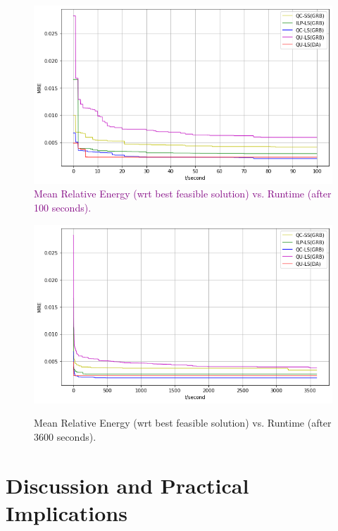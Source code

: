 \documentclass[preprint,12pt]{elsarticle}
\begin{document}
\begin{figure}[t]%
	
	\includegraphics[width=\textwidth]{Figures/MRE_100s_DA3_NEW.png}  
	\caption{\textcolor{purple}{Mean Relative Energy (wrt best feasible solution) vs. Runtime (after 100 seconds).}}%
	
	\label{fig:results1}%
\end{figure}

\begin{figure}[t]%
	
	\includegraphics[width=\textwidth]{Figures/MRE_3600s_DA3.png}   \\%
	\caption{Mean Relative Energy (wrt best feasible solution) vs. Runtime (after 3600 seconds).}%
	
	\label{fig:results2}%
\end{figure}



\section{Discussion and Practical Implications}
\label{sec:discussion}
\end{document}
